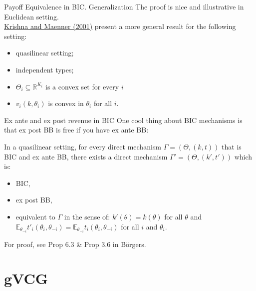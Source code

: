 \documentclass[english,10pt
,aspectratio=169
]{beamer}
\begin{document}
\begin{frame}{Payoff Equivalence in BIC. Generalization}
	The proof is nice and illustrative in Euclidean setting.\\ \href{https://onlinelibrary.wiley.com/doi/abs/10.1111/1468-0262.00233}{\uline{Krishna and Maenner (2001)}} present a more general result for the following setting:
	\begin{itemize}
		\item quasilinear setting;
		\item independent types;
		\item $\Theta_i \subseteq \mathbb{R}^{K_i}$ is a convex set for every $i$ 
		\item $v_i(k,\theta_i)$ is convex in $\theta_i$ for all $i$.
	\end{itemize}
\end{frame}


\begin{frame}{Ex ante and ex post revenue in BIC}
	One cool thing about BIC mechanisms is that ex post BB is free if you have ex ante BB:
	\begin{theorem}
		In a \alert{quasilinear} setting, for every direct mechanism $\Gamma = (\Theta, (k,t))$ that is BIC and \alert{ex ante BB}, there exists a direct mechanism $\Gamma' = (\Theta, (k',t'))$ which is:
		\begin{itemize}
			\item BIC,
			\item \alert{ex post BB},
			\item equivalent to $\Gamma$ in the sense of: $k'(\theta) = k(\theta)$ for all $\theta$ and $\mathbb{E}_{\theta_{-i}} t'_i(\theta_i,\theta_{-i}) = \mathbb{E}_{\theta_{-i}} t_i(\theta_i,\theta_{-i})$ for all $i$ and $\theta_i$.
		\end{itemize}
	\end{theorem}
	For proof, see Prop 6.3 \& Prop 3.6 in B{\"o}rgers.
\end{frame}


\section{gVCG}
\end{document}
